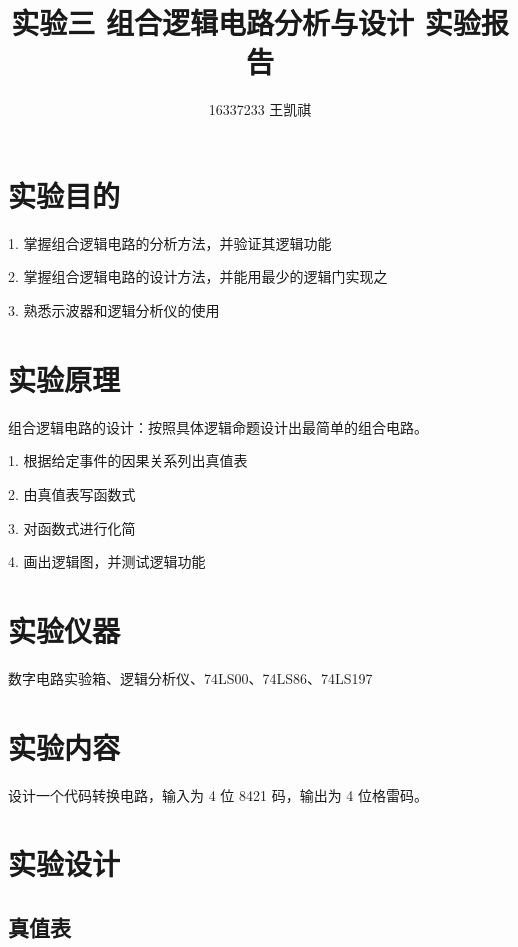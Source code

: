 \documentclass{article}
\begin{document}
\title{实验三 \text{ } 组合逻辑电路分析与设计 \text{ } 实验报告}
\author {16337233 王凯祺}
\maketitle

\section{实验目的}

1. 掌握组合逻辑电路的分析方法，并验证其逻辑功能

2. 掌握组合逻辑电路的设计方法，并能用最少的逻辑门实现之

3. 熟悉示波器和逻辑分析仪的使用

\section{实验原理}

组合逻辑电路的设计：按照具体逻辑命题设计出最简单的组合电路。

1. 根据给定事件的因果关系列出真值表

2. 由真值表写函数式

3. 对函数式进行化简

4. 画出逻辑图，并测试逻辑功能

\section{实验仪器}

数字电路实验箱、逻辑分析仪、74LS00、74LS86、74LS197

\section{实验内容}

设计一个代码转换电路，输入为 4 位 8421 码，输出为 4 位格雷码。

\newpage

\section{实验设计}

\subsection{真值表}
\end{document}
